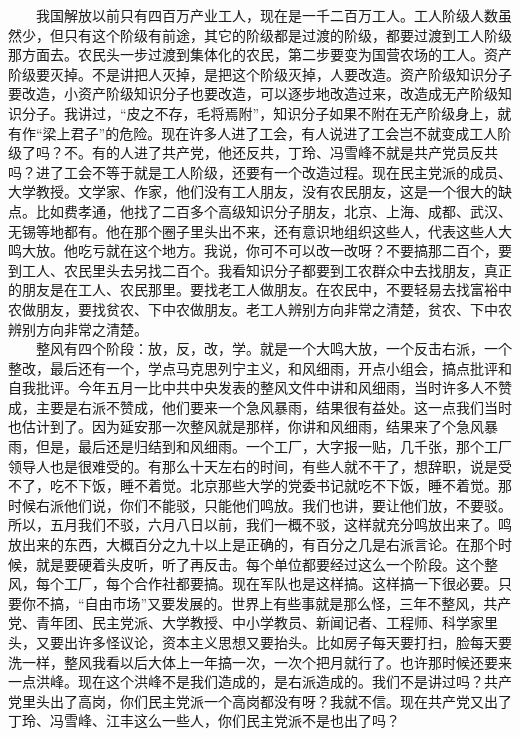 \documentclass[cn,11pt,chinese]{elegantbook}
\begin{document}
　　我国解放以前只有四百万产业工人，现在是一千二百万工人。工人阶级人数虽然少，但只有这个阶级有前途，其它的阶级都是过渡的阶级，都要过渡到工人阶级那方面去。农民头一步过渡到集体化的农民，第二步要变为国营农场的工人。资产阶级要灭掉。不是讲把人灭掉，是把这个阶级灭掉，人要改造。资产阶级知识分子要改造，小资产阶级知识分子也要改造，可以逐步地改造过来，改造成无产阶级知识分子。我讲过，“皮之不存，毛将焉附”，知识分子如果不附在无产阶级身上，就有作“梁上君子”的危险。现在许多人进了工会，有人说进了工会岂不就变成工人阶级了吗？不。有的人进了共产党，他还反共，丁玲、冯雪峰不就是共产党员反共吗？进了工会不等于就是工人阶级，还要有一个改造过程。现在民主党派的成员、大学教授。文学家、作家，他们没有工人朋友，没有农民朋友，这是一个很大的缺点。比如费孝通，他找了二百多个高级知识分子朋友，北京、上海、成都、武汉、无锡等地都有。他在那个圈子里头出不来，还有意识地组织这些人，代表这些人大鸣大放。他吃亏就在这个地方。我说，你可不可以改一改呀？不要搞那二百个，要到工人、农民里头去另找二百个。我看知识分子都要到工农群众中去找朋友，真正的朋友是在工人、农民那里。要找老工人做朋友。在农民中，不要轻易去找富裕中农做朋友，要找贫农、下中农做朋友。老工人辨别方向非常之清楚，贫农、下中农辨别方向非常之清楚。\\
　　整风有四个阶段：放，反，改，学。就是一个大鸣大放，一个反击右派，一个整改，最后还有一个，学点马克思列宁主义，和风细雨，开点小组会，搞点批评和自我批评。今年五月一比中共中央发表的整风文件中讲和风细雨，当时许多人不赞成，主要是右派不赞成，他们要来一个急风暴雨，结果很有益处。这一点我们当时也估计到了。因为延安那一次整风就是那样，你讲和风细雨，结果来了个急风暴雨，但是，最后还是归结到和风细雨。一个工厂，大字报一贴，几千张，那个工厂领导人也是很难受的。有那么十天左右的时间，有些人就不干了，想辞职，说是受不了，吃不下饭，睡不着觉。北京那些大学的党委书记就吃不下饭，睡不着觉。那时候右派他们说，你们不能驳，只能他们鸣放。我们也讲，要让他们放，不要驳。所以，五月我们不驳，六月八日以前，我们一概不驳，这样就充分鸣放出来了。鸣放出来的东西，大概百分之九十以上是正确的，有百分之几是右派言论。在那个时候，就是要硬着头皮听，听了再反击。每个单位都要经过这么一个阶段。这个整风，每个工厂，每个合作社都要搞。现在军队也是这样搞。这样搞一下很必要。只要你不搞，“自由市场”又要发展的。世界上有些事就是那么怪，三年不整风，共产党、青年团、民主党派、大学教授、中小学教员、新闻记者、工程师、科学家里头，又要出许多怪议论，资本主义思想又要抬头。比如房子每天要打扫，脸每天要洗一样，整风我看以后大体上一年搞一次，一次个把月就行了。也许那时候还要来一点洪峰。现在这个洪峰不是我们造成的，是右派造成的。我们不是讲过吗？共产党里头出了高岗，你们民主党派一个高岗都没有呀？我就不信。现在共产党又出了丁玲、冯雪峰、江丰这么一些人，你们民主党派不是也出了吗？\\
\end{document}
